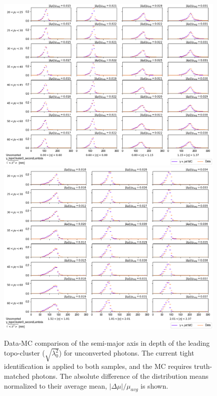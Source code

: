 \begin{figure}[!thp]
    \centering
    \includegraphics[width=.74\textwidth]{chapters/chapter4_photonID/images/y_topoCluster0_secondLambda_Unconverted_lowerEta.png}
    \includegraphics[width=.74\textwidth]{chapters/chapter4_photonID/images/y_topoCluster0_secondLambda_Unconverted_upperEta.png}
    \caption[Data-MC comparison of the semi-major axis in depth of the leading topo-cluster ($\sqrt{\lambda_0^2}$) for unconverted photons]{Data-MC comparison of the semi-major axis in depth of the leading topo-cluster ($\sqrt{\lambda_0^2}$) for unconverted photons. The current tight identification is applied to both samples, and the \gls{MC} requires truth-matched photons. The absolute difference of the distribution means normalized to their average mean, $|\Delta \mu|/\mu_{avg}$ is shown.}
    \label{fig:data-mc-secondLambda}
\end{figure}
